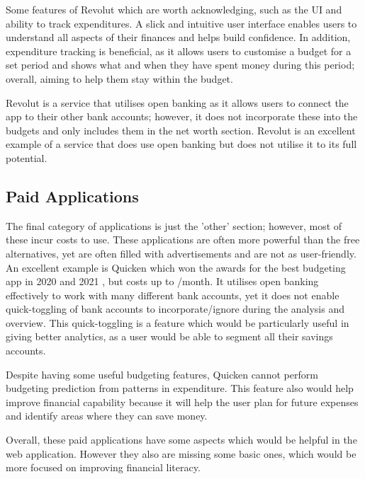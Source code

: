 Some features of Revolut which are worth acknowledging, such as the UI and ability to track expenditures. A slick and intuitive user interface enables users to understand all aspects of their finances and helps build confidence. In addition, expenditure tracking is beneficial, as it allows users to customise a budget for a set period and shows what and when they have spent money during this period; overall, aiming to help them stay within the budget.

Revolut is a service that utilises open banking as it allows users to connect the app to their other bank accounts; however, it does not incorporate these into the budgets and only includes them in the net worth section. Revolut is an excellent example of a service that does use open banking but does not utilise it to its full potential.

\subsection{Paid Applications}
\label{sec:paid-applications}
The final category of applications is just the 'other' section; however, most of these incur costs to use. These applications are often more powerful than the free alternatives, yet are often filled with advertisements and are not as user-friendly. An excellent example is Quicken which won the awards for the best budgeting app in 2020 and 2021 \cite{Quicken}, but costs up to /month. It utilises open banking effectively to work with many different bank accounts, yet it does not enable quick-toggling of bank accounts to incorporate/ignore during the analysis and overview. This quick-toggling is a feature which would be particularly useful in giving better analytics, as a user would be able to segment all their savings accounts. 

Despite having some useful budgeting features, Quicken cannot perform budgeting prediction from patterns in expenditure. This feature also would help improve financial capability because it will help the user plan for future expenses and identify areas where they can save money. 

Overall, these paid applications have some aspects which would be helpful in the web application. However they also are missing some basic ones, which would be more focused on improving financial literacy.

